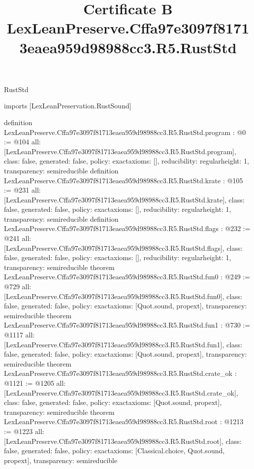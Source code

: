 \begin{lexlean}{RustStd}
\title{Certificate B LexLeanPreserve.Cffa97e3097f81713eaea959d98988cc3.R5.RustStd}
\begin{coremodule}
imports [LexLeanPreservation.RustSound]

definition LexLeanPreserve.Cffa97e3097f81713eaea959d98988cc3.R5.RustStd.program : @0 := @104 {
  all: [LexLeanPreserve.Cffa97e3097f81713eaea959d98988cc3.R5.RustStd.program],
  class: false,
  generated: false,
  policy: exact{axioms: []},
  reducibility: regular{height: 1},
  transparency: semireducible
}
definition LexLeanPreserve.Cffa97e3097f81713eaea959d98988cc3.R5.RustStd.krate : @105 := @231 {
  all: [LexLeanPreserve.Cffa97e3097f81713eaea959d98988cc3.R5.RustStd.krate],
  class: false,
  generated: false,
  policy: exact{axioms: []},
  reducibility: regular{height: 1},
  transparency: semireducible
}
definition LexLeanPreserve.Cffa97e3097f81713eaea959d98988cc3.R5.RustStd.flags : @232 := @241 {
  all: [LexLeanPreserve.Cffa97e3097f81713eaea959d98988cc3.R5.RustStd.flags],
  class: false,
  generated: false,
  policy: exact{axioms: []},
  reducibility: regular{height: 1},
  transparency: semireducible
}
theorem LexLeanPreserve.Cffa97e3097f81713eaea959d98988cc3.R5.RustStd.fun0 : @249 := @729 {
  all: [LexLeanPreserve.Cffa97e3097f81713eaea959d98988cc3.R5.RustStd.fun0],
  class: false,
  generated: false,
  policy: exact{axioms: [Quot.sound, propext]},
  transparency: semireducible
}
theorem LexLeanPreserve.Cffa97e3097f81713eaea959d98988cc3.R5.RustStd.fun1 : @730 := @1117 {
  all: [LexLeanPreserve.Cffa97e3097f81713eaea959d98988cc3.R5.RustStd.fun1],
  class: false,
  generated: false,
  policy: exact{axioms: [Quot.sound, propext]},
  transparency: semireducible
}
theorem LexLeanPreserve.Cffa97e3097f81713eaea959d98988cc3.R5.RustStd.crate_ok : @1121 := @1205 {
  all: [LexLeanPreserve.Cffa97e3097f81713eaea959d98988cc3.R5.RustStd.crate_ok],
  class: false,
  generated: false,
  policy: exact{axioms: [Quot.sound, propext]},
  transparency: semireducible
}
theorem LexLeanPreserve.Cffa97e3097f81713eaea959d98988cc3.R5.RustStd.root : @1213 := @1223 {
  all: [LexLeanPreserve.Cffa97e3097f81713eaea959d98988cc3.R5.RustStd.root],
  class: false,
  generated: false,
  policy: exact{axioms: [Classical.choice, Quot.sound, propext]},
  transparency: semireducible
}


\end{coremodule}
\end{lexlean}
